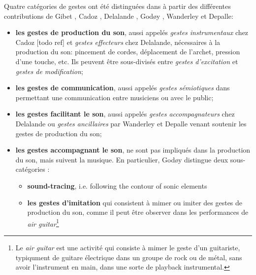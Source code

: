 

Quatre catégories de gestes ont été distinguées dans \cite{jensenius_musical_2010} à partir des différentes contributions de Gibet \cite{gibet_codage_1987}, Cadoz \cite{cadoz_gesture_2000}, Delalande \cite{delalande_geste_1988}, Godøy \cite{godoy_exploring_2006}, Wanderley et Depalle\cite{wanderley_gestural_2004}:

\vspace{-1em}
\begin{itemize}[noitemsep]
\item \textbf{les gestes de production du son}, aussi appelés \textit{gestes instrumentaux} chez Cadoz [todo ref]  et \textit{gestes effecteurs} chez Delalande, nécessaires à la production du son: pincement de cordes, déplacement de l'archet, pression d'une touche, etc. Ils peuvent être sous-divisés entre \textit{gestes d'excitation} et \textit{gestes de modification};
\item \textbf{les gestes de communication}, aussi appelés \textit{gestes sémiotiques} dans \cite{cadoz_gesture_2000} permettant une communication entre musiciens ou avec le public;
\item \textbf{les gestes facilitant le son}, aussi appelés \textit{gestes accompagnateurs} chez Delalande \cite{delalande_geste_1988} ou \textit{gestes ancillaires} par Wanderley et Depalle \cite{wanderley_gestural_2004} venant soutenir les gestes de production du son;
\item \textbf{les gestes accompagnant le son}, ne sont pas impliqués dans la production du son, mais suivent la musique. En particulier, Godøy distingue deux sous-catégories :
	\begin{itemize}[noitemsep]
		\item \textbf{sound-tracing}, i.e. following the contour of sonic elements \cite{godoy_playing_2005}
		\item \textbf{les gestes d'imitation} qui consistent à mimer ou imiter des gestes de production du son, comme il peut être observer dans les performances de \textit{air guitar}\footnote{Le \textit{air guitar} est une activité qui consiste à mimer le geste d’un guitariste, typiqument de guitare électrique dans un groupe de rock ou de métal, sans avoir l’instrument en main, dans une sorte de playback instrumental.} \cite{godoy_playing_2005}
	\end{itemize}
\end{itemize}

